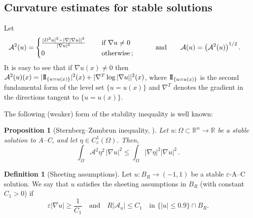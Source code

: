 \documentclass{article}
\newcommand{\R}{\mathbb{R}}
\newcommand{\ep}{\varepsilon}
\newtheorem{proposition}[theorem]{Proposition}
\theoremstyle{definition}
\newtheorem{definition}[theorem]{Definition}
\begin{document}
\subsection{Curvature estimates for stable solutions}\label{sec:wangwei}
Let
\begin{align}
        \mathcal A^2(u)&=\begin{cases}
            \frac{|D^2u|^2-|\nabla|\nabla u||^2}{|\nabla u|^2}\quad &\mbox{ if } \nabla u\neq 0\\
            0 &\mbox{ otherwise\,;}
        \end{cases}
        \qquad \quad \mbox{and}\qquad \mathcal A(u)=\left(\mathcal A^2(u)\right)^{1/2}. \label{eq:AC2formdef}
    \end{align}
It is easy to see that if $\nabla u(x)\neq 0$ then $\mathcal A^2(u)(x)=|{\rm I\negthinspace I}_{\{u=u(x)\}}|^2(x)+|\nabla^T \log|\nabla u||^2(x)$, where ${\rm I\negthinspace I}_{\{u=u(x)\}}$ is the second fundamental form of the level set $\{u=u(x)\}$ and $\nabla^T$ denotes the gradient in the directions tangent to $\{u=u(x)\}$.

The following (weaker) form of the stability inequality is well known:
\begin{proposition}[Sternberg--Zumbrun inequality, \cite{SZ98}]\label{prop:SZstab}
    Let $u:\Omega\subset\R^n\to \R$ be a stable solution to A--C, and let $\eta\in C_c^1(\Omega)$. Then,
    \begin{equation}\label{eq:SZineq1}
        \int_{\Omega}\mathcal A^2\eta^2\,|\nabla u|^2\leq\int_{\Omega} |\nabla \eta|^2|\nabla u|^2\,.
    \end{equation}
\end{proposition}
\begin{definition}[Sheeting assumptions]\label{def:sheetassump}
Let $u:B_R\to (-1,1)$ be a stable $\ep$-A--C solution. We say that $u$ satisfies the sheeting assumptions in $B_R$ (with constant $C_1>0$) if
\begin{equation}\label{eq:sheetassump}
     \ep|\nabla u|\geq \frac{1}{C_1}\quad \mbox{and} \quad R|\mathcal{A}_u|\leq C_1 \quad \mbox{in } \{|u|\leq 0.9\}\cap B_R.
\end{equation}
\end{definition}
\end{document}
